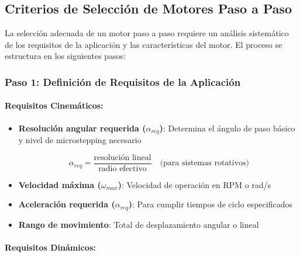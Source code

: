 \subsection{Criterios de Selección de Motores Paso a Paso}

La selección adecuada de un motor paso a paso requiere un análisis sistemático de los requisitos de la aplicación y las características del motor. El proceso se estructura en los siguientes pasos:

\subsubsection{Paso 1: Definición de Requisitos de la Aplicación}

\paragraph{Requisitos Cinemáticos:}

\begin{itemize}
    \item \textbf{Resolución angular requerida ($\alpha_{req}$)}: Determina el ángulo de paso básico y nivel de microstepping necesario
    
    \begin{equation}
    \alpha_{req} = \frac{\text{resolución lineal}}{\text{radio efectivo}} \quad \text{(para sistemas rotativos)}
    \end{equation}
    
    \item \textbf{Velocidad máxima ($\omega_{max}$)}: Velocidad de operación en RPM o rad/s
    
    \item \textbf{Aceleración requerida ($\alpha_{req}$)}: Para cumplir tiempos de ciclo especificados
    
    \item \textbf{Rango de movimiento}: Total de desplazamiento angular o lineal
\end{itemize}

\paragraph{Requisitos Dinámicos:}

